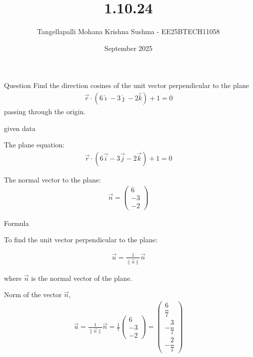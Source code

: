 \documentclass{beamer}
\title %
{1.10.24}
\date{September 2025}
\author %
{Tangellapalli Mohana Krishna Sushma - EE25BTECH11058}
\begin{document}
\frame{\titlepage}
\begin{frame}{Question}
 Find the direction cosines of the unit vector perpendicular to the plane
\begin{align*}
    \vec{r} \cdot (6\hat{\imath} - 3\hat{\jmath} - 2\hat{k}) + 1 = 0
\end{align*}
\hspace{1cm}passing through the origin.


\end{frame}

\begin{frame}{given data}

The plane equation:
\begin{align*}
\vec{r} \cdot (6\vec{i} - 3\vec{j} - 2\vec{k}) + 1 = 0
\end{align*}

The normal vector to the plane:
\begin{align*}
\vec{n} = \begin{pmatrix} 6 \\ -3 \\ -2 \end{pmatrix}
\end{align*}
\end{frame}

\begin{frame}{Formula}

To find the unit vector perpendicular to the plane:

\begin{align*}
\vec{u} = \frac{1}{\|\vec{n}\|} \vec{n}
\end{align*}

where $\vec{n}$ is the normal vector of the plane.

\end{frame}

Norm of the vector $\vec{n}$,
\begin{align}
    \vec{u} = \frac{1}{\|\vec{n}\|} \vec{n} 
    = \frac{1}{7}
    \begin{pmatrix}
        6 \\[2pt]
        -3 \\[2pt]
        -2
    \end{pmatrix}
    =
    \begin{pmatrix}
        \dfrac{6}{7} \\[2pt]
        -\dfrac{3}{7} \\[2pt]
        -\dfrac{2}{7}
    \end{pmatrix}
\end{align}
\end{document}
